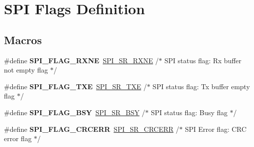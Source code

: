 \hypertarget{group___s_p_i___flags__definition}{}\section{S\+PI Flags Definition}
\label{group___s_p_i___flags__definition}
\subsection*{Macros}
\begin{DoxyCompactItemize}
\item 
\mbox{\label{group___s_p_i___flags__definition_ga7bd627ae57160a2f0aad1736194b5999}} 
\#define {\bfseries S\+P\+I\+\_\+\+F\+L\+A\+G\+\_\+\+R\+X\+NE}~\hyperlink{group___peripheral___registers___bits___definition_ga40e14de547aa06864abcd4b0422d8b48}{S\+P\+I\+\_\+\+S\+R\+\_\+\+R\+X\+NE}   /$\ast$ S\+PI status flag\+: Rx buffer not empty flag       $\ast$/
\item 
\mbox{\label{group___s_p_i___flags__definition_gaf84a1e6af2739a6be58e1b23d9e6b914}} 
\#define {\bfseries S\+P\+I\+\_\+\+F\+L\+A\+G\+\_\+\+T\+XE}~\hyperlink{group___peripheral___registers___bits___definition_ga5bd5d21816947fcb25ccae7d3bf8eb2c}{S\+P\+I\+\_\+\+S\+R\+\_\+\+T\+XE}    /$\ast$ S\+PI status flag\+: Tx buffer empty flag           $\ast$/
\item 
\mbox{\label{group___s_p_i___flags__definition_gaf19c77ee876a3598d616ac07d136fc46}} 
\#define {\bfseries S\+P\+I\+\_\+\+F\+L\+A\+G\+\_\+\+B\+SY}~\hyperlink{group___peripheral___registers___bits___definition_gaa3498df67729ae048dc5f315ef7c16bf}{S\+P\+I\+\_\+\+S\+R\+\_\+\+B\+SY}    /$\ast$ S\+PI status flag\+: Busy flag                      $\ast$/
\item 
\mbox{\label{group___s_p_i___flags__definition_ga30fb6af50e1f3c61cb9de76b0101c889}} 
\#define {\bfseries S\+P\+I\+\_\+\+F\+L\+A\+G\+\_\+\+C\+R\+C\+E\+RR}~\hyperlink{group___peripheral___registers___bits___definition_ga69e543fa9584fd636032a3ee735f750b}{S\+P\+I\+\_\+\+S\+R\+\_\+\+C\+R\+C\+E\+RR} /$\ast$ S\+PI Error flag\+: C\+RC error flag                  $\ast$/
\item 
\mbox{\label{group___s_p_i___flags__definition_gac7d3525ab98cc18f02270a4dba685897}} 

\end{DoxyCompactItemize}
